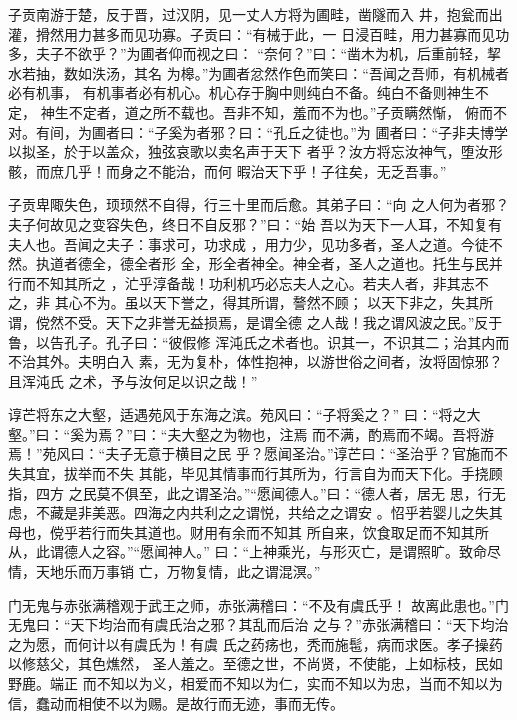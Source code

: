 \documentclass[a4paper,12pt,UTF8,twoside]{ctexbook}
\begin{document}
子贡南游于楚，反于晋，过汉阴，见一丈人方将为圃畦，凿隧而入 井，抱瓮而出灌，搰然用力甚多而见功寡。子贡曰：“有械于此，一 日浸百畦，用力甚寡而见功多，夫子不欲乎？”为圃者仰而视之曰： “奈何？”曰：“凿木为机，后重前轻，挈水若抽，数如泆汤，其名 为槔。”为圃者忿然作色而笑曰：“吾闻之吾师，有机械者必有机事， 有机事者必有机心。机心存于胸中则纯白不备。纯白不备则神生不定， 神生不定者，道之所不载也。吾非不知，羞而不为也。”子贡瞒然惭， 俯而不对。有间，为圃者曰：“子奚为者邪？曰：“孔丘之徒也。”为 圃者曰：“子非夫博学以拟圣，於于以盖众，独弦哀歌以卖名声于天下 者乎？汝方将忘汝神气，堕汝形骸，而庶几乎！而身之不能治，而何 暇治天下乎！子往矣，无乏吾事。”

子贡卑陬失色，顼顼然不自得，行三十里而后愈。其弟子曰：“向 之人何为者邪？夫子何故见之变容失色，终日不自反邪？”曰：“始 吾以为天下一人耳，不知复有夫人也。吾闻之夫子：事求可，功求成 ，用力少，见功多者，圣人之道。今徒不然。执道者德全，德全者形 全，形全者神全。神全者，圣人之道也。托生与民并行而不知其所之 ，汒乎淳备哉！功利机巧必忘夫人之心。若夫人者，非其志不之，非 其心不为。虽以天下誉之，得其所谓，謷然不顾； 以天下非之，失其所谓，傥然不受。天下之非誉无益损焉，是谓全德 之人哉！我之谓风波之民。”反于鲁，以告孔子。孔子曰：“彼假修 浑沌氏之术者也。识其一，不识其二；治其内而不治其外。夫明白入 素，无为复朴，体性抱神，以游世俗之间者，汝将固惊邪？且浑沌氏 之术，予与汝何足以识之哉！”

谆芒将东之大壑，适遇苑风于东海之滨。苑风曰：“子将奚之？” 曰：“将之大壑。”曰：“奚为焉？”曰：“夫大壑之为物也，注焉 而不满，酌焉而不竭。吾将游焉！”苑风曰：“夫子无意于横目之民 乎？愿闻圣治。”谆芒曰：“圣治乎？官施而不失其宜，拔举而不失 其能，毕见其情事而行其所为，行言自为而天下化。手挠顾指，四方 之民莫不俱至，此之谓圣治。”“愿闻德人。”曰：“德人者，居无 思，行无虑，不藏是非美恶。四海之内共利之之谓悦，共给之之谓安 。怊乎若婴儿之失其母也，傥乎若行而失其道也。财用有余而不知其 所自来，饮食取足而不知其所从，此谓德人之容。”“愿闻神人。” 曰：“上神乘光，与形灭亡，是谓照旷。致命尽情，天地乐而万事销 亡，万物复情，此之谓混溟。”

门无鬼与赤张满稽观于武王之师，赤张满稽曰：“不及有虞氏乎！ 故离此患也。”门无鬼曰：“天下均治而有虞氏治之邪？其乱而后治 之与？”赤张满稽曰：“天下均治之为愿，而何计以有虞氏为！有虞 氏之药疡也，秃而施髢，病而求医。孝子操药以修慈父，其色燋然， 圣人羞之。至德之世，不尚贤，不使能，上如标枝，民如野鹿。端正 而不知以为义，相爱而不知以为仁，实而不知以为忠，当而不知以为 信，蠢动而相使不以为赐。是故行而无迹，事而无传。
\end{document}
